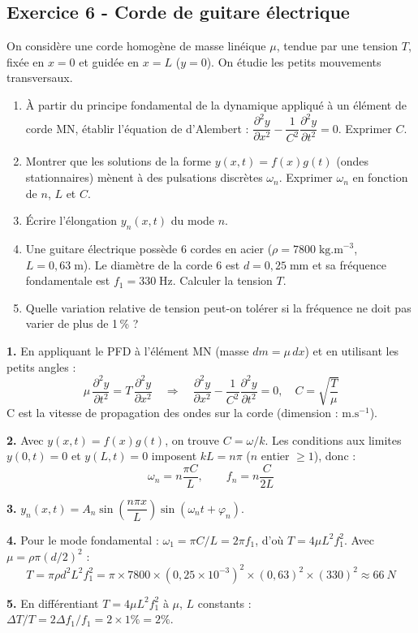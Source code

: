 \documentclass[12pt,a4paper]{article}
\begin{document}
\subsection*{Exercice 6 - Corde de guitare électrique \niveau{\moyen}}

\begin{boiteexercice}
On considère une corde homogène de masse linéique $\mu$, tendue par une tension $T$, fixée en $x=0$ et guidée en $x=L$ ($y=0$). On étudie les petits mouvements transversaux.
\begin{enumerate}
  \item À partir du principe fondamental de la dynamique appliqué à un élément de corde MN, établir l'équation de d'Alembert : $\dfrac{\partial^2 y}{\partial x^2} - \dfrac{1}{C^2}\dfrac{\partial^2 y}{\partial t^2} = 0$. Exprimer $C$.
  \item Montrer que les solutions de la forme $y(x,t) = f(x)g(t)$ (ondes stationnaires) mènent à des pulsations discrètes $\omega_n$. Exprimer $\omega_n$ en fonction de $n$, $L$ et $C$.
  \item Écrire l'élongation $y_n(x,t)$ du mode $n$.
  \item Une guitare électrique possède 6 cordes en acier ($\rho = 7800\;\text{kg.m}^{-3}$, $L = 0{,}63\;\text{m}$). Le diamètre de la corde 6 est $d = 0{,}25\;\text{mm}$ et sa fréquence fondamentale est $f_1 = 330\;\text{Hz}$. Calculer la tension $T$.
  \item Quelle variation relative de tension peut-on tolérer si la fréquence ne doit pas varier de plus de 1\,\% ?
\end{enumerate}
\end{boiteexercice}

\begin{boitecorrige}
\textbf{1.} En appliquant le PFD à l'élément MN (masse $dm = \mu\,dx$) et en utilisant les petits angles :
\[
\mu\,\frac{\partial^2 y}{\partial t^2} = T\,\frac{\partial^2 y}{\partial x^2}
\quad\Longrightarrow\quad
\frac{\partial^2 y}{\partial x^2} - \frac{1}{C^2}\frac{\partial^2 y}{\partial t^2} = 0, \quad C = \sqrt{\frac{T}{\mu}}
\]
C est la vitesse de propagation des ondes sur la corde (dimension : $\text{m.s}^{-1}$).

\textbf{2.} Avec $y(x,t) = f(x)g(t)$, on trouve $C = \omega/k$. Les conditions aux limites $y(0,t) = 0$ et $y(L,t) = 0$ imposent $kL = n\pi$ ($n$ entier $\geq 1$), donc :
\[
\omega_n = n\frac{\pi C}{L}, \qquad f_n = n\frac{C}{2L}
\]

\textbf{3.} $y_n(x,t) = A_n\sin\!\left(\dfrac{n\pi x}{L}\right)\sin\!\left(\omega_n t + \varphi_n\right)$.

\textbf{4.} Pour le mode fondamental : $\omega_1 = \pi C/L = 2\pi f_1$, d'où $T = 4\mu L^2 f_1^2$. Avec $\mu = \rho\pi(d/2)^2$ :
\[
T = \pi\rho d^2 L^2 f_1^2 = \pi\times7800\times(0{,}25\times10^{-3})^2\times(0{,}63)^2\times(330)^2 \approx \qty{66}{N}
\]

\textbf{5.} En différentiant $T = 4\mu L^2 f_1^2$ à $\mu$, $L$ constants : $\Delta T/T = 2\Delta f_1/f_1 = 2\times1\% = 2\%$.
\end{boitecorrige}
\end{document}
